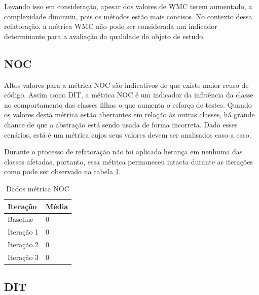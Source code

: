 Levando isso em consideração, apesar dos valores de WMC
terem aumentado, a complexidade diminuiu, pois os métodos estão mais concisos.
No contexto dessa refatoração, a métrica WMC não pode ser considerada um
indicador determinante para a avaliação da qualidade do objeto de estudo.


\subsection{NOC}

Altos valores para a métrica NOC são indicativos de que existe maior reuso de
código. Assim como DIT, a métrica NOC é um indicador da influência da classe
no comportamento das classes filhas o que aumenta o esforço de testes. Quando os
valores desta métrica estão aberrantes em relação às outras classes, há grande
chance de que a abstração está sendo usada de forma incorreta. Dado esses cenários, está é um métrica cujos
seus valores devem ser analisados caso a caso.

Durante o processo de refatoração não foi aplicada herança em nenhuma das
classes afetadas, portanto, essa métrica permaneceu intacta durante as iterações
como pode ser observado na tabela \ref{tab:noc}. %

\begin{table}[!h]
	\centering
	    \caption{Dados métrica NOC}
    \begin{tabular}{ | l | l | }
    \hline
    Iteração & Média 			\\ \hline
    Baseline & 0  	\\ \hline
    Iteração 1 & 0			\\ \hline
	Iteração 2 & 0				\\ \hline
	Iteração 3 & 0	\\ \hline
    \end{tabular}
    \label{tab:noc}
\end{table}



\subsection{DIT}

